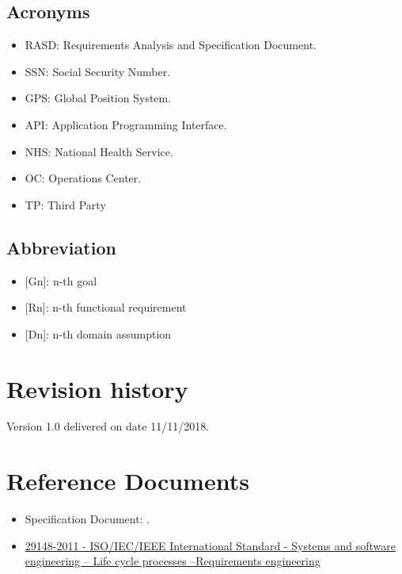 \subsection{Acronyms}
\begin{itemize}
    \item RASD: Requirements Analysis and Specification Document. 
    \item SSN: Social Security Number.
    \item GPS: Global Position System.
    \item API: Application Programming Interface.
    \item NHS: National Health Service.
    \item OC: Operations Center.
    \item TP: Third Party
\end{itemize}

\subsection{Abbreviation}
\begin{itemize}
    \item {[Gn]}: n-th goal
    \item {[Rn]}: n-th functional requirement
    \item {[Dn]}: n-th domain assumption
\end{itemize}

\section{Revision history}
Version 1.0 delivered on date 11/11/2018.

\section{Reference Documents}
\begin{itemize}
    \item Specification Document: . 
    \item \href{https://ieeexplore.ieee.org/document/6146379} {29148-2011 - ISO/IEC/IEEE International Standard - Systems and software engineering -- Life cycle processes --Requirements engineering}
\end{itemize}

